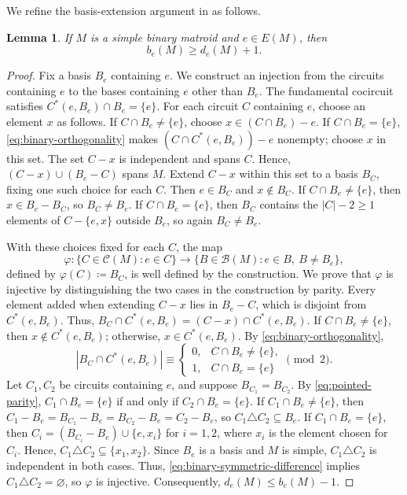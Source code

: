 \documentclass[10pt,a4paper]{article}
\numberwithin{equation}{section}
\newtheorem{lemma}[lemma]{Lemma}
\newcommand{\BB}{\mathcal B}
\newcommand{\CC}{\mathcal C}
\begin{document}
We refine the basis-extension argument in
\cite[proof of Theorem~1.3]{Oxley1983} as follows.
\begin{lemma}\label{lem:pointed}
If \(M\) is a simple binary matroid and \(e\in E(M)\), then
\[
 b_e(M)\ge d_e(M)+1.
\]
\end{lemma}
\begin{proof}
Fix a basis \(B_e\) containing \(e\). We construct an injection
from the circuits containing \(e\) to the bases containing \(e\)
other than \(B_e\).
The fundamental cocircuit satisfies
\(C^*(e,B_e)\cap B_e=\{e\}\).
For each circuit \(C\) containing \(e\), choose an element \(x\)
as follows. If \(C\cap B_e\ne\{e\}\), choose
\(x\in(C\cap B_e)-e\). If \(C\cap B_e=\{e\}\),
\eqref{eq:binary-orthogonality} makes
\((C\cap C^*(e,B_e))-e\) nonempty;
choose \(x\) in this set.
The set \(C-x\) is independent and spans \(C\).
Hence, \((C-x)\cup(B_e-C)\) spans \(M\). Extend \(C-x\)
within this set to a basis \(B_C\), fixing one such choice for each
\(C\). Then \(e\in B_C\) and \(x\notin B_C\).
If \(C\cap B_e\ne\{e\}\), then \(x\in B_e-B_C\), so \(B_C\ne B_e\).
If \(C\cap B_e=\{e\}\), then \(B_C\) contains the
\(|C|-2\ge1\) elements of \(C-\{e,x\}\) outside \(B_e\),
so again \(B_C\ne B_e\).

With these choices fixed for each \(C\), the map
\[
 \varphi:\{C\in\CC(M):e\in C\}\to
 \{B\in\BB(M):e\in B,\ B\ne B_e\},
\]
defined by \(\varphi(C)\coloneqq B_C\), is well defined by the construction.
We prove that \(\varphi\) is injective by distinguishing the
two cases in the construction by parity. Every element added when extending
\(C-x\) lies in \(B_e-C\), which is disjoint from \(C^*(e,B_e)\).
Thus, \(B_C\cap C^*(e,B_e)=(C-x)\cap C^*(e,B_e)\).
If \(C\cap B_e\ne\{e\}\), then \(x\notin C^*(e,B_e)\);
otherwise, \(x\in C^*(e,B_e)\).
By \eqref{eq:binary-orthogonality},
\begin{equation}\label{eq:pointed-parity}
 |B_C\cap C^*(e,B_e)|\equiv
 \begin{cases}
 0,&C\cap B_e\ne\{e\},\\
 1,&C\cap B_e=\{e\}
 \end{cases}
 \pmod2.
\end{equation}
Let \(C_1,C_2\) be circuits containing \(e\), and suppose
\(B_{C_1}=B_{C_2}\). By \eqref{eq:pointed-parity},
\(C_1\cap B_e=\{e\}\) if and only if \(C_2\cap B_e=\{e\}\).
If \(C_1\cap B_e\ne\{e\}\), then
\(C_1-B_e=B_{C_1}-B_e=B_{C_2}-B_e=C_2-B_e\), so
\(C_1\triangle C_2\subseteq B_e\).
If \(C_1\cap B_e=\{e\}\), then
\(C_i=(B_{C_i}-B_e)\cup\{e,x_i\}\) for \(i=1,2\), where \(x_i\)
is the element chosen for \(C_i\). Hence,
\(C_1\triangle C_2\subseteq\{x_1,x_2\}\).
Since \(B_e\) is a basis and \(M\) is simple,
\(C_1\triangle C_2\) is independent in both cases.
Thus, \eqref{eq:binary-symmetric-difference} implies
\(C_1\triangle C_2=\varnothing\), so \(\varphi\) is injective.
Consequently, \(d_e(M)\le b_e(M)-1\).
\end{proof}
\end{document}
